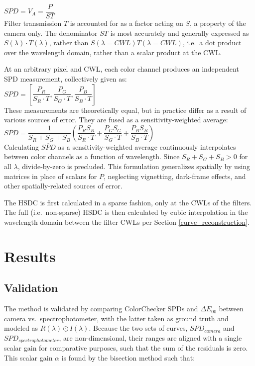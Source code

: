 \documentclass[twocolumn,10pt]{asme2ej}
\newcommand{\id}{\hspace{6 mm}}
\begin{document}
 $SPD = V_A = \dfrac{P}{ST}$ \\

Filter transmission $T$ is accounted for as a factor acting on $S$, a property of the camera only. The denominator $ST$ is most accurately and generally expressed as $S(\lambda) \cdot T(\lambda)$, rather than $S(\lambda=CWL) T(\lambda=CWL)$, i.e.\ a dot product over the wavelength domain, rather than a scalar product at the CWL.

\id At an arbitrary pixel and CWL, each color channel produces an independent SPD measurement, collectively given as: \\

 $SPD = \left[ \dfrac{P_R}{S_R \cdot T},\dfrac{P_G}{S_G \cdot T},\dfrac{P_B}{S_B \cdot T} \right] $ \\

These measurements are theoretically equal, but in practice differ as a result of various sources of error. They are fused as a sensitivity-weighted average: \\

$\overline{SPD} = \dfrac{1}{S_R+S_G+S_B} \left( \dfrac{P_R S_R}{S_R \cdot T} + \dfrac{P_G S_G}{S_G \cdot T} + \dfrac{P_B S_B}{S_B \cdot T} \right)$\\

Calculating $\overline{SPD}$ as a sensitivity-weighted average continuously interpolates between color channels as a function of wavelength. Since $S_R+S_G+S_B > 0$ for all $\lambda$, divide-by-zero is precluded. This formulation generalizes spatially by using matrices in place of scalars for $P$, neglecting vignetting, dark-frame effects, and other spatially-related sources of error.

\id The HSDC is first calculated in a sparse fashion, only at the CWLs of the filters. The full (i.e.\ non-sparse) HSDC is then calculated by cubic interpolation in the wavelength domain between the filter CWLs per Section \ref{curve_reconstruction}.

\section{Results}
\subsection{Validation}
\label{validation}

The method is validated by comparing ColorChecker SPDs and $\Delta E_{00}$ between camera vs.\ spectrophotometer, with the latter taken as ground truth and modeled as $R(\lambda) \odot I(\lambda)$. Because the two sets of curves, $SPD_{camera}$ and $SPD_{spectrophotometer}$, are non-dimensional, their ranges are aligned with a single scalar gain for comparative purposes, such that the sum of the residuals is zero. This scalar gain $\alpha$ is found by the bisection method such that:\\
\end{document}
